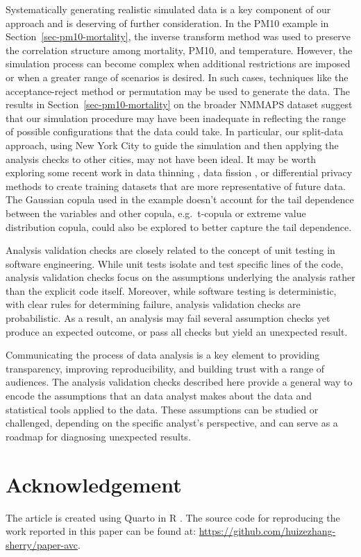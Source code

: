 \documentclass[
  12pt,
]{interact}
\begin{document}
Systematically generating realistic simulated data is a key component of
our approach and is deserving of further consideration. In the PM10
example in Section~\ref{sec-pm10-mortality}, the inverse transform
method was used to preserve the correlation structure among mortality,
PM10, and temperature. However, the simulation process can become
complex when additional restrictions are imposed or when a greater range
of scenarios is desired. In such cases, techniques like the
acceptance-reject method or permutation may be used to generate the
data. The results in Section~\ref{sec-pm10-mortality} on the broader
NMMAPS dataset suggest that our simulation procedure may have been
inadequate in reflecting the range of possible configurations that the
data could take. In particular, our split-data approach, using New York
City to guide the simulation and then applying the analysis checks to
other cities, may not have been ideal. It may be worth exploring some
recent work in data thinning \citep{neufeld2024data}, data fission
\citep{leiner2023data}, or differential privacy methods
\citep{dong_gaussian_2022} to create training datasets that are more
representative of future data. The Gaussian copula used in the example
doesn't account for the tail dependence between the variables and other
copula, e.g.~t-copula or extreme value distribution copula, could also
be explored to better capture the tail dependence.

Analysis validation checks are closely related to the concept of unit
testing in software engineering. While unit tests isolate and test
specific lines of the code, analysis validation checks focus on the
assumptions underlying the analysis rather than the explicit code
itself. Moreover, while software testing is deterministic, with clear
rules for determining failure, analysis validation checks are
probabilistic. As a result, an analysis may fail several assumption
checks yet produce an expected outcome, or pass all checks but yield an
unexpected result.

Communicating the process of data analysis is a key element to providing
transparency, improving reproducibility, and building trust with a range
of audiences. The analysis validation checks described here provide a
general way to encode the assumptions that an data analyst makes about
the data and statistical tools applied to the data. These assumptions
can be studied or challenged, depending on the specific analyst's
perspective, and can serve as a roadmap for diagnosing unexpected
results.

\section{Acknowledgement}\label{acknowledgement}

The article is created using Quarto \citep{Allaire_Quarto_2022} in R
\citep{R}. The source code for reproducing the work reported in this
paper can be found at:
\url{https://github.com/huizezhang-sherry/paper-avc}.


\renewcommand\refname{References}
  
\end{document}
